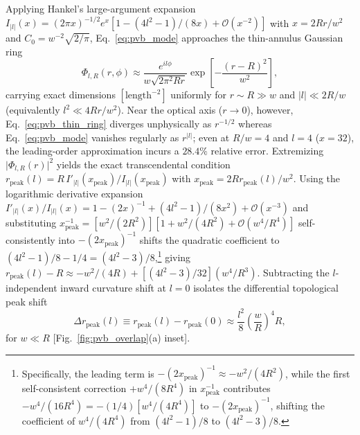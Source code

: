 \documentclass[aps,pra,onecolumn,notitlepage,11pt,tightenlines,nofootinbib,floatfix,longbibliography]{revtex4-2}
\theoremstyle{remark}
\newcommand{\abs}[1]{\lvert #1 \rvert}
\begin{document}
Applying Hankel's large-argument expansion $I_{\abs{l}}(x) = (2\pi x)^{-1/2} e^x [1 - (4l^2 - 1)/(8x) + \mathcal{O}(x^{-2})]$ with $x = 2Rr/w^2$ and $C_0 = w^{-2}\sqrt{2/\pi}$, Eq.~\eqref{eq:pvb_mode} approaches the thin-annulus Gaussian ring~\cite{Ferreira2026}
\begin{equation}
\Phi_{l,R}(r,\phi) \approx \frac{e^{il\phi}}{w\sqrt{2\pi^2 Rr}} \exp\!\left[-\frac{(r - R)^2}{w^2}\right],
\label{eq:pvb_thin_ring}
\end{equation}
carrying exact dimensions $[\mathrm{length}^{-2}]$ uniformly for $r \sim R \gg w$ and $\abs{l} \ll 2R/w$ (equivalently $l^2 \ll 4Rr/w^2$). Near the optical axis ($r \to 0$), however, Eq.~\eqref{eq:pvb_thin_ring} diverges unphysically as $r^{-1/2}$ whereas Eq.~\eqref{eq:pvb_mode} vanishes regularly as $r^{\abs{l}}$; even at $R/w = 4$ and $l = 4$ ($x = 32$), the leading-order approximation incurs a $28.4\%$ relative error. Extremizing $\abs{\Phi_{l,R}(r)}^2$ yields the exact transcendental condition $r_{\mathrm{peak}}(l) = R\,I'_{\abs{l}}(x_{\mathrm{peak}})/I_{\abs{l}}(x_{\mathrm{peak}})$ with $x_{\mathrm{peak}} = 2R r_{\mathrm{peak}}(l)/w^2$. Using the logarithmic derivative expansion $I'_{\abs{l}}(x)/I_{\abs{l}}(x) = 1 - (2x)^{-1} + (4l^2 - 1)/(8x^2) + \mathcal{O}(x^{-3})$ and substituting $x_{\mathrm{peak}}^{-1} = [w^2/(2R^2)][1 + w^2/(4R^2) + \mathcal{O}(w^4/R^4)]$ self-consistently into $-(2x_{\mathrm{peak}})^{-1}$ shifts the quadratic coefficient to $(4l^2 - 1)/8 - 1/4 = (4l^2 - 3)/8$,\footnote{Specifically, the leading term is $-(2x_{\mathrm{peak}})^{-1} \approx -w^2/(4R^2)$, while the first self-consistent correction $+w^4/(8R^4)$ in $x_{\mathrm{peak}}^{-1}$ contributes $-w^4/(16R^4) = -(1/4)[w^4/(4R^4)]$ to $-(2x_{\mathrm{peak}})^{-1}$, shifting the coefficient of $w^4/(4R^4)$ from $(4l^2 - 1)/8$ to $(4l^2 - 3)/8$.} giving $r_{\mathrm{peak}}(l) - R \approx -w^2/(4R) + [(4l^2 - 3)/32](w^4/R^3)$. Subtracting the $l$-independent inward curvature shift at $l = 0$ isolates the differential topological peak shift
\begin{equation}
\Delta r_{\mathrm{peak}}(l) \equiv r_{\mathrm{peak}}(l) - r_{\mathrm{peak}}(0) \approx \frac{l^2}{8}\left(\frac{w}{R}\right)^4 R,
\label{eq:peak_shift}
\end{equation}
for $w \ll R$ [Fig.~\ref{fig:pvb_overlap}(a) inset].
\end{document}
